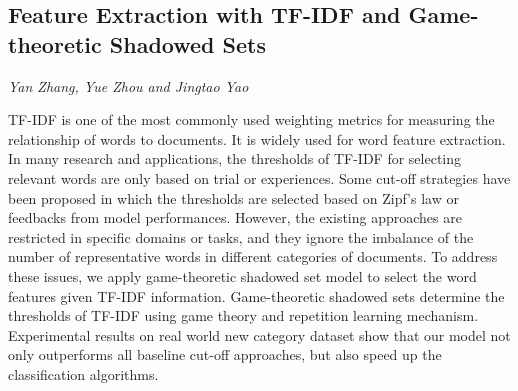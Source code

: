 \documentclass[../booklet.tex]{subfiles}
\begin{document}
\subsection[Feature Extraction with TF-IDF and Game-theoretic Shadowed Sets. {\it Yan Zhang, Yue Zhou and Jingtao Yao}]{Feature Extraction with TF-IDF and Game-theoretic Shadowed Sets}
  

\begin{center}
  {\it Yan Zhang, Yue Zhou and Jingtao Yao}
\end{center}

\vskip 0.8cm



TF-IDF is one of the most commonly used weighting metrics for measuring the relationship of words to documents. It is widely used for word feature extraction. In many research and applications, the thresholds of TF-IDF for selecting relevant words are only based on trial or experiences. Some cut-off strategies have been proposed in which the thresholds are selected based on Zipf's law or feedbacks from model performances.
However, the existing approaches are restricted in specific domains or tasks, and they ignore the imbalance of the number of representative words in different categories of documents. To address these issues, we apply game-theoretic shadowed set model to select the word features given TF-IDF information.
Game-theoretic shadowed sets determine the thresholds of TF-IDF using game theory and repetition learning mechanism.
Experimental results on real world new category dataset show that our model not only outperforms all baseline cut-off approaches, but also speed up the classification algorithms.


\end{document}
